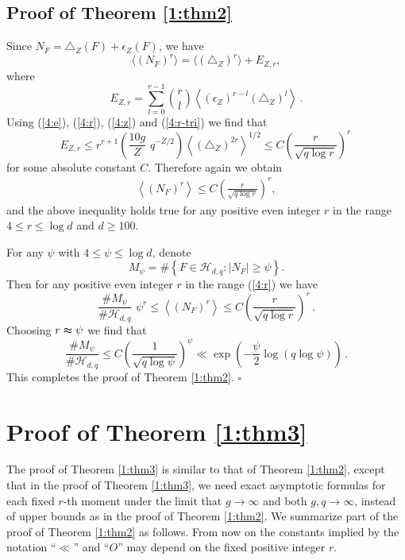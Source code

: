 \documentclass[12pt]{amsart}
\theoremstyle{plain}
\newcommand{\HH}{{\mathcal H}}
\begin{document}
\subsection{Proof of Theorem \ref{1:thm2}}

Since $N_F=\triangle_Z(F)+\epsilon_Z(F)$, we have
\[\langle (N_F)^r \rangle=\langle (\triangle_Z)^r \rangle +E_{Z,r},\]
where
\[E_{Z,r}=\sum_{l=0}^{r-1 }\binom{r}{l} \left\langle (\epsilon_Z)^{r-l}(\triangle_Z)^l\right\rangle\,.\]
Using (\ref{4:e}), (\ref{4:r}), (\ref{4:z}) and (\ref{4:r-tri}) we find that
\[E_{Z,r} \le r^{r+1} \left(\frac{10g}{Z} \,\,q^{-Z/2}\right)\left\langle (\triangle_Z)^{2r}\right\rangle^{1/2} \le C \left(\frac{r}{\sqrt{q \log r}}\right)^r\,\]
for some absolute constant $C$. Therefore again we obtain
\begin{eqnarray*} \label{4:nfc} \left\langle (N_F)^r \right\rangle \le C \left(\frac{r}{\sqrt{q \log r}}\right)^r,\end{eqnarray*}
and the above inequality holds true for any positive even integer $r$ in the range $4 \le r \le \log d$ and $d \ge 100$.

For any $\psi$ with $4 \le \psi \le \log d$, denote
\[M_{\psi}=\#\left\{F \in \HH_{d,q}: |N_F| \ge \psi\right\}.\]
Then for any positive even integer $r$ in the range (\ref{4:r}) we have
\[\frac{\# M_{\psi}}{\#\HH_{d,q}} \,\,\psi^r \le \left\langle (N_F)^r \right\rangle \le C \left(\frac{r}{\sqrt{q \log r}}\right)^r\,.\]
Choosing $r \thickapprox \psi$ we find that
\[\frac{\# M_{\psi}}{\#\HH_{d,q}} \le C \left(\frac{1}{\sqrt{q \log \psi}}\right)^{\psi} \ll \exp \left(-\frac{\psi}{2} \log (q \log \psi)\right)\,.\]
This completes the proof of Theorem \ref{1:thm2}. \quad $\square$


\section{Proof of Theorem \ref{1:thm3}}

The proof of Theorem \ref{1:thm3} is similar to that of Theorem \ref{1:thm2}, except that in the proof of Theorem \ref{1:thm3}, we need exact asymptotic formulas for each fixed $r$-th moment under the limit that $g \to \infty$ and both $g,q \to \infty$, instead of upper bounds as in the proof of Theorem \ref{1:thm2}. We summarize part of the proof of Theorem \ref{1:thm2} as follows. From now on the constants implied by the notation ``$\ll$'' and ``$O$'' may depend on the fixed positive integer $r$.
\end{document}
